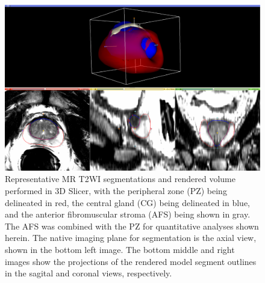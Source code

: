 \begin{figure}[htb!]
\centering
\includegraphics[width=1.0\textwidth]{figs/MR_P79_SegsVol.eps}
\caption{Representative MR T2WI segmentations and rendered volume performed in
    3D Slicer, with the peripheral zone (PZ) being delineated in red, the
    central gland (CG) being delineated in blue, and the anterior fibromuscular
    stroma (AFS) being shown in gray.  The AFS was combined with the PZ for
    quantitative analyses shown herein.  The native imaging plane for
    segmentation is the axial view, shown in the bottom left image.  The bottom
    middle and right images show the projections of the rendered model segment
    outlines in the sagital and coronal views, respectively.}
\label{fig:mr_segs_vol} 
\end{figure}
